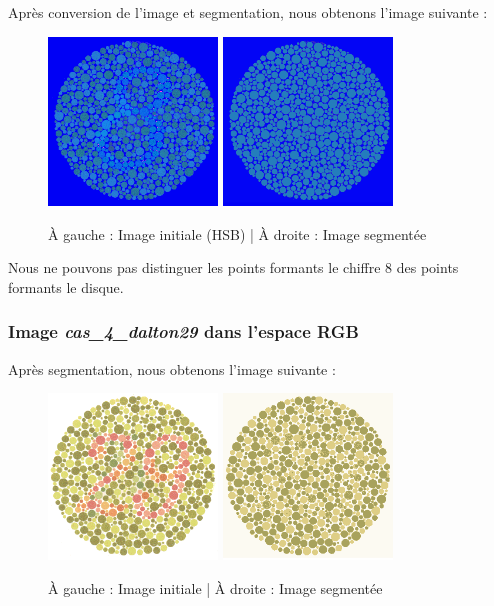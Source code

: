 \documentclass[a4paper]{article}
\begin{document}
Après conversion de l'image et segmentation, nous obtenons l'image suivante :

\begin{figure}[H]
\begin{center}
\includegraphics[width=170px]{../resultats/cas_4_dalton8_hsb.png}
\includegraphics[width=170px]{../resultats/cas_4_dalton8_hsb_seg.png}
\end{center}
\caption{À gauche : Image initiale (HSB) | À droite : Image segmentée}
\end{figure}

Nous ne pouvons pas distinguer les points formants le chiffre 8 des points formants le disque.

\clearpage
\subsubsection{Image {\em cas\_4\_dalton29} dans l'espace RGB}

Après segmentation, nous obtenons l'image suivante :

\begin{figure}[H]
\begin{center}
\includegraphics[width=170px]{../base/cas_4_dalton29.png}
\includegraphics[width=170px]{../resultats/cas_4_dalton29_seg.png}
\end{center}
\caption{À gauche : Image initiale | À droite : Image segmentée}
\end{figure}
\end{document}
